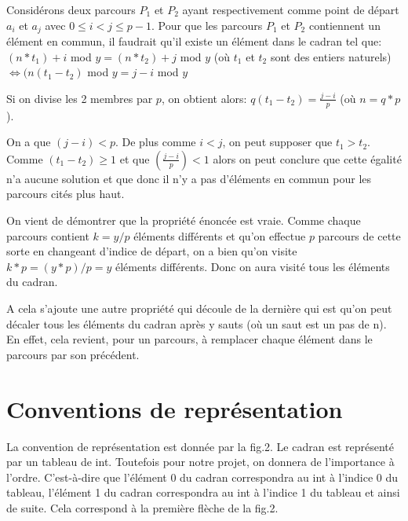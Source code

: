 \documentclass[a4paper, 12pt]{article}
\begin{document}
Considérons deux parcours $P_{1}$ et $P_{2}$ ayant respectivement comme point de départ $a_{i}$ et $a_{j}$ avec $0 \leq i < j \leq p-1$. Pour que les parcours $P_{1}$ et $P_{2}$ contiennent un élément en commun, il faudrait qu'il existe un élément dans le cadran tel que:\newline
$(n*t_{1})+i$ mod $y = (n*t_{2})+j$ mod $y$  (où $t_{1}$ et $t_{2}$ sont des entiers naturels)\newline
$\Leftrightarrow (n(t_{1} - t_{2})$ mod $y = j-i$ mod $y$ \newline

Si on divise les 2 membres par $p$, on obtient alors:\newline
$q(t_{1} - t_{2}) = \frac{j-i}{p}$  (où $n=q*p$).\newline

On a que $(j-i) < p$. De plus comme $i < j$, on peut supposer que $t_{1} > t_{2}$. Comme $(t_{1}-t_{2}) \geq 1$ et que $(\frac{j-i}{p}) < 1$ alors on peut conclure que cette égalité n'a aucune solution et que donc il n'y a pas d'éléments en commun pour les parcours cités plus haut.\newline

On vient de démontrer que la propriété énoncée est vraie. Comme chaque parcours contient $k = y/p$ éléments différents et qu'on effectue $p$ parcours de cette sorte en changeant d'indice de départ, on a bien qu'on visite $k*p = (y*p)/p = y $ éléments différents. Donc on aura visité tous les éléments du cadran. \newline

A cela s'ajoute une autre propriété qui découle de la dernière qui est qu'on peut décaler tous les éléments du cadran après y sauts (où un saut est un pas de n). En effet, cela revient, pour un parcours, à remplacer chaque élément dans le parcours par son précédent.

\newpage
\section{Conventions de représentation}

La convention de représentation est donnée par la fig.2. Le cadran est représenté par un tableau de int. Toutefois pour notre projet, on donnera de l'importance à l'ordre. C'est-à-dire que l'élément 0 du cadran correspondra au int à l'indice 0 du tableau, l'élément 1 du cadran correspondra au int à l'indice 1 du tableau et ainsi de suite. Cela correspond à la première flèche de la fig.2.
\end{document}
